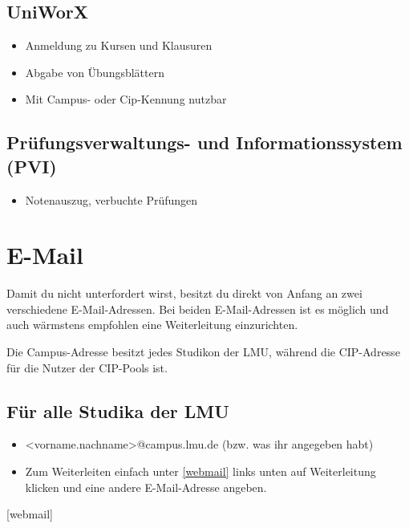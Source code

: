 \subsection*{UniWorX\subjectList{\subjectI{}\subjectMI{}}}
\begin{itemize}
	\item Anmeldung zu Kursen und Klausuren
	\item Abgabe von Übungsblättern
	\item Mit Campus- oder Cip-Kennung nutzbar
\end{itemize}
\begin{urlList}
\end{urlList}

\subsection*{Prüfungsverwaltungs- und Informationssystem (PVI)\subjectList{\subjectI{}\subjectMI{}}}
\begin{itemize}
	\item Notenauszug, verbuchte Prüfungen
\end{itemize}
\begin{urlList}
\end{urlList}

\section{E-Mail}
Damit du nicht unterfordert wirst, besitzt du direkt von Anfang an zwei verschiedene E-Mail-Adressen. Bei beiden E-Mail-Adressen ist es möglich und auch wärmstens empfohlen eine Weiterleitung einzurichten.

Die Campus-Adresse besitzt jedes Studikon der LMU, während die CIP-Adresse für die Nutzer der CIP-Pools ist.

\subsection*{Für alle Studika der LMU}
\begin{itemize}
	\item <vorname.nachname>@campus.lmu.de (bzw. was ihr angegeben habt)
	\item Zum Weiterleiten einfach unter \ref{webmail} links unten auf Weiterleitung klicken und eine andere E-Mail-Adresse angeben.
\end{itemize}
\begin{urlList}
	[webmail]
\end{urlList}

